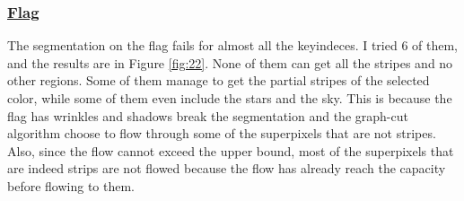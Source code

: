 \subsubsection{\href{./hw5/flag1.jpg}{Flag}}
The segmentation on the flag fails for almost all the keyindeces.
I tried 6 of them, and the results are in Figure \ref{fig:22}.
None of them can get all the stripes and no other regions.
Some of them manage to get the partial stripes of the selected color, while some of them even include the stars and the sky.
This is because the flag has wrinkles and shadows break the segmentation and the graph-cut algorithm choose to flow through some of the superpixels that are not stripes.
Also, since the flow cannot exceed the upper bound, most of the superpixels that are indeed strips are not flowed because the flow has already reach the capacity before flowing to them.
